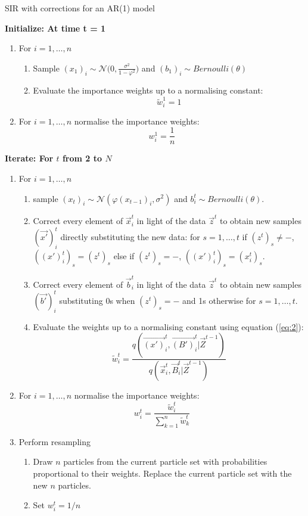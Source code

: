 \begin{algorithm}[H]
\caption{SIR with corrections for an AR(1) model}\label{euclid}
 \begin{algorithmic}

 \State  \bf{Initialize:} \normalfont At time t = 1
            
\begin{enumerate}
	\item For $i = 1, \dots , n$
	\begin{enumerate}
		\item Sample $(x_{1})_i \sim \mathcal{N} \Bigg (0, \frac{\sigma^2}{1- \varphi^2} \Bigg)$ and $(b_1)_i \sim Bernoulli(\theta)$
		\item Evaluate the importance weights up to a normalising constant:
		\[
		\tilde{w}^{1}_{i} = 1
		\]
	\end{enumerate}
	\item For $i = 1, \dots , n$ normalise the importance weights: 
	\[
	w^{1}_{i} = \frac{1}{n}
	\]
\end{enumerate}

 \State  \bf{Iterate:} \normalfont For $t$ from 2 to $N$

\begin{enumerate}
	\item For $i = 1, \dots , n$
	\begin{enumerate}
  		\item sample $(x_t)_i \sim \mathcal{N} (\varphi (x_{t-1})_i, \sigma^{2})$ and $b^t_{i} \sim Bernoulli(\theta)$.
		\item {Correct every element of $\vec{x}^t_i$ in light of the data $\vec{z}^t$ to obtain new samples $(\vec{x'})^t_i$ directly substituting the new data: for $s = 1, \dots ,t$ if $(z^t)_s \neq -$, $((x')_i^t)_s = (z^t)_s$ else if $(z^t)_s = -$, $((x')_i^t)_s = (x^t_i)_s$.}
		\item Correct every element of $\vec{b}_i^t$ in light of the data $\vec{z}^t$ to obtain new samples $(\vec{b'})^t_i$ substituting 0s when $(z^t)_s = -$ and 1s otherwise for $s = 1, \dots, t$.
		\item Evaluate the weights up to a normalising constant using equation (\ref{eq:2}):
		\[
		\tilde{w}^{t}_{i} = \frac{q(\vec{(x')}^{t}_i, \vec{(B')}^{t}_i | \vec{Z}^{t-1})}{q(\vec{x}^{t}_i, \vec{B}^{t}_i | \vec{Z}^{t-1})}
		\]
	\end{enumerate}
	\item For $i = 1, \dots , n$ normalise the importance weights:
	\[
	w^{t}_{i} = \frac{\tilde{w}^t_i}{\sum_{k=1}^{n}\tilde{w}^{t}_k}
	\]
	\item Perform resampling
	\begin{enumerate}
	    \item Draw $n$ particles from the current particle set with probabilities proportional to their weights. Replace the current particle set with the new $n$ particles.
	    \item Set $w^t_i=1/n$
	\end{enumerate}
\end{enumerate}
  
 \end{algorithmic}
\end{algorithm}

